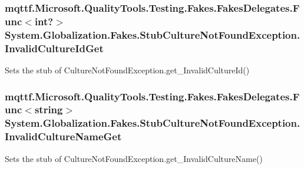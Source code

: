 \hypertarget{class_system_1_1_globalization_1_1_fakes_1_1_stub_culture_not_found_exception_a954a72f0016db2ae7f5920f66e76f314}{
\subsubsection[{Invalid\-Culture\-Id\-Get}]{\setlength{\rightskip}{0pt plus 5cm}mqttf.\-Microsoft.\-Quality\-Tools.\-Testing.\-Fakes.\-Fakes\-Delegates.\-Func$<$int?$>$ System.\-Globalization.\-Fakes.\-Stub\-Culture\-Not\-Found\-Exception.\-Invalid\-Culture\-Id\-Get}}\label{class_system_1_1_globalization_1_1_fakes_1_1_stub_culture_not_found_exception_a954a72f0016db2ae7f5920f66e76f314}


Sets the stub of Culture\-Not\-Found\-Exception.\-get\-\_\-\-Invalid\-Culture\-Id()

\hypertarget{class_system_1_1_globalization_1_1_fakes_1_1_stub_culture_not_found_exception_aff35fe2ae68d486256c3fa44f7fc2351}{
\subsubsection[{Invalid\-Culture\-Name\-Get}]{\setlength{\rightskip}{0pt plus 5cm}mqttf.\-Microsoft.\-Quality\-Tools.\-Testing.\-Fakes.\-Fakes\-Delegates.\-Func$<$string$>$ System.\-Globalization.\-Fakes.\-Stub\-Culture\-Not\-Found\-Exception.\-Invalid\-Culture\-Name\-Get}}\label{class_system_1_1_globalization_1_1_fakes_1_1_stub_culture_not_found_exception_aff35fe2ae68d486256c3fa44f7fc2351}


Sets the stub of Culture\-Not\-Found\-Exception.\-get\-\_\-\-Invalid\-Culture\-Name()

